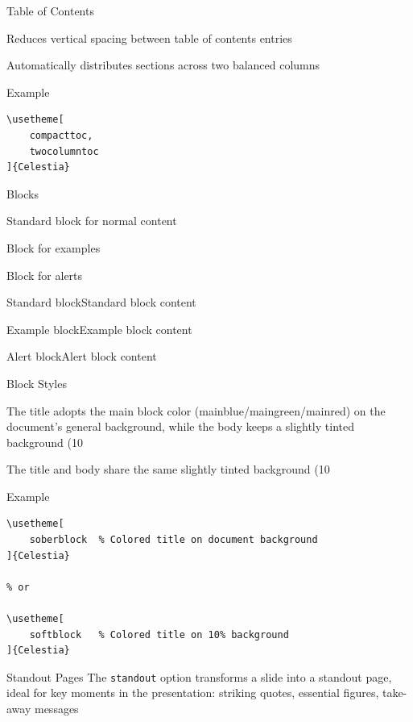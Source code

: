 \documentclass[10pt,english,aspectratio=1610,xcolor=svgnames]{beamer}
\begin{document}
\begin{frame}[fragile]{Table of Contents}
    \begin{description}[twocolumntoc]
        \item[compacttoc] Reduces vertical spacing between table of contents entries
        \item[twocolumntoc] Automatically distributes sections across two balanced columns
    \end{description}

    \begin{exampleblock}{Example}
        \begin{lstlisting}[style=latex]
\usetheme[
    compacttoc,
    twocolumntoc
]{Celestia}
        \end{lstlisting}
    \end{exampleblock}
\end{frame}

\begin{frame}{Blocks}
    \begin{description}[exampleblock]
        \item[block] Standard block for normal content
        \item[exampleblock] Block for examples
        \item[alertblock] Block for alerts
    \end{description}

    \begin{block}{Standard block}Standard block content\end{block}
    \begin{exampleblock}{Example block}Example block content\end{exampleblock}
    \begin{alertblock}{Alert block}Alert block content\end{alertblock}
\end{frame}

\begin{frame}[fragile]{Block Styles}
    \begin{description}[soberblock]
        \item[soberblock] The title adopts the main block color (mainblue/maingreen/mainred) on the document's general background, while the body keeps a slightly tinted background (10%
        \item[softblock] The title and body share the same slightly tinted background (10%
    \end{description}

    \begin{exampleblock}{Example}
        \begin{lstlisting}[style=latex]
\usetheme[
    soberblock  % Colored title on document background
]{Celestia}

% or

\usetheme[
    softblock   % Colored title on 10% background
]{Celestia}
        \end{lstlisting}
    \end{exampleblock}

\end{frame}

\begin{frame}[standout]{Standout Pages}
    The \texttt{standout} option transforms a slide into a standout page, ideal for key moments in the presentation: striking quotes, essential figures, take-away messages
\end{frame}
\end{document}

